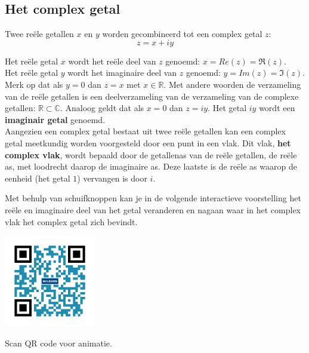 \subsection{Het complex getal}

\begin{definitie}
Twee re\"{e}le getallen $x$ en $y$ worden gecombineerd tot een complex getal $z$:
\begin{equation*}
z=x+iy
\end{equation*}
\end{definitie}

Het re\"{e}le getal $x$ wordt het re\"{e}le deel van $z$ genoemd: $x=Re(z)=\Re(z)$.\\
Het re\"{e}le getal $y$ wordt het imaginaire deel van $z$ genoemd: $y=Im(z)=\Im(z)$.\\
Merk op dat als $y=0$ dan $z=x$ met $x \in \mathbb{R}$. Met andere woorden de verzameling van de re\"{e}le getallen is een deelverzameling van de verzameling van de complexe getallen: $\mathbb{R} \subset \mathbb{C}$. Analoog geldt dat als $x=0$ dan $z=iy$. Het getal $iy$ wordt een {\bf imaginair getal} genoemd.\\

Aangezien een complex getal bestaat uit twee re\"{e}le getallen kan een complex getal meetkundig worden voorgesteld door een punt in een vlak. Dit vlak, {\bf het complex vlak}, wordt bepaald door de getallenas van de re\"{e}le getallen, de re\"{e}le as, met loodrecht daarop de imaginaire as. Deze laatste is de re\"{e}le as waarop de eenheid (het getal $1$) vervangen is door $i$.  



Met behulp van schuifknoppen kan je in de volgende interactieve voorstelling het re\"{e}le en imaginaire deel van het getal veranderen en nagaan waar in het complex vlak het complex getal zich bevindt.\\


\begin{minipage}{.25\linewidth}
	\raggedright
	\includegraphics[width=4cm]{3_gonio_complexe_getallen/inputs/QR_Code_ANIMATIE1_module3}
\end{minipage}
\begin{minipage}{.7\linewidth}
	Scan QR code voor animatie.
\end{minipage}\\

